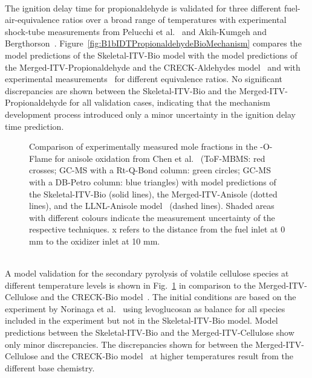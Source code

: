 \begin{refsection}
\begin{figure}[b]
  \label{fig:B1bCellulosePyrolysisBioMechanism}
\end{figure}
\\
The ignition delay time for propionaldehyde is validated for three different fuel-air-equivalence ratios over a broad range of temperatures with experimental shock-tube measurements from Pelucchi et al.~\cite{Pelucchi2015} and Akih-Kumgeh and Bergthorson~\cite{AkihKumgeh2011}. Figure~\ref{fig:B1bIDTPropionaldehydeBioMechanism} compares the model predictions of the Skeletal-ITV-Bio model with the model predictions of the Merged-ITV-Propionaldehyde and the CRECK-Aldehydes model~\cite{Pelucchi2015} and with experimental measurements~\cite{Pelucchi2015, AkihKumgeh2011} for different equivalence ratios. No significant discrepancies are shown between the Skeletal-ITV-Bio and the Merged-ITV-Propionaldehyde for all validation cases, indicating that the mechanism development process introduced only a minor uncertainty in the ignition delay time prediction.
\begin{figure}[t]
  \centering
  \hfill
  \hfill
  \caption{Comparison of experimentally measured mole fractions in the -O-Flame for anisole oxidation from Chen et al.~\cite{Chen2022} (ToF-MBMS: red crosses; GC-MS with a Rt-Q-Bond column: green circles; GC-MS with a DB-Petro column: blue triangles) with model predictions of the Skeletal-ITV-Bio (solid lines), the Merged-ITV-Anisole (dotted lines), and the LLNL-Anisole model~\cite{Wagnon2018} (dashed lines). Shaded areas with different colours indicate the measurement uncertainty of the respective techniques. x refers to the distance from the fuel inlet at 0 mm to the oxidizer inlet at 10 mm.}
  \label{fig:B1bAnisoleOxidationBioMechanismOXY}
\end{figure}
\\
A model validation for the secondary pyrolysis of volatile cellulose species at different temperature levels is shown in Fig.~\ref{fig:B1bCellulosePyrolysisBioMechanism} in comparison to the Merged-ITV-Cellulose and the CRECK-Bio model~\cite{Debiagi2016}. The initial conditions are based on the experiment by Norinaga et al.~\cite{Norinaga2013} using levoglucosan as balance for all species included in the experiment but not in the Skeletal-ITV-Bio model. Model predictions between the Skeletal-ITV-Bio and the Merged-ITV-Cellulose show only minor discrepancies. The discrepancies shown for  between the Merged-ITV-Cellulose and the CRECK-Bio model~\cite{Debiagi2016} at higher temperatures result from the different base chemistry.

\end{refsection}
